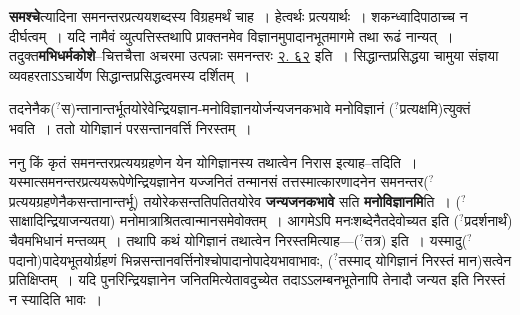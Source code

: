 \documentclass[article,12pt,a4paper]{memoir}
\newcommand{\unclear}[1]{($^{?}$#1)}
\begin{document}
	  \pstart \textbf{समश्चे}त्यादिना समनन्तरप्रत्ययशब्दस्य विग्रहमर्थं चाह । हेत्वर्थः प्रत्ययार्थः । शकन्ध्वादिपाठाच्च न दीर्घत्वम् । यदि नामैवं व्युत्पत्तिस्तथापि प्राक्तनमेव विज्ञानमुपादानभूतमागमे तथा रूढं नान्यत् । तदुक्त\textbf{मभिधर्मकोशे}--चित्तचैत्ता अचरमा उत्पन्नाः समनन्तरः \href{http://sarit.indology.info/?cref=ak.2.62}{२. ६२} इति । सिद्धान्तप्रसिद्धया चामुया संज्ञया व्यवहरताऽऽचार्येण सिद्धान्तप्रसिद्धत्वमस्य दर्शितम् ।
	\pend
	  \bigskip
	  \begingroup
	

	  \pstart तदनेनैक\unclear{स}न्तानान्तर्भूतयोरेवेन्द्रियज्ञान-मनोविज्ञानयोर्जन्यजनकभावे मनोविज्ञानं \unclear{प्रत्यक्षमि}त्युक्तं भवति । ततो योगिज्ञानं परसन्तानवर्त्ति निरस्तम् ।
	\pend
      
	  \endgroup
	

	  \pstart ननु किं कृतं समनन्तरप्रत्ययग्रहणेन येन योगिज्ञानस्य तथात्वेन निरास इत्याह--तदिति । यस्मात्समनन्तरप्रत्ययरूपेणेन्द्रियज्ञानेन यज्जनितं तन्मानसं तत्तस्मात्कारणादनेन समनन्तर\unclear{प्रत्ययग्रहणेनैकसन्तानान्तर्भू} तयोरेकसन्ततिपतितयोरेव \textbf{जन्यजनकभावे} सति \textbf{मनोविज्ञानमि}ति । \unclear{साक्षादिन्द्रियाजन्यतया} मनोमात्राश्रितत्वान्मानसमेवोक्तम् । आगमेऽपि मनःशब्देनैतदेवोच्यत इति \unclear{प्रदर्शनार्थं} चैवमभिधानं मन्तव्यम् । तथापि कथं योगिज्ञानं तथात्वेन निरस्तमित्याह—\unclear{तत्र} इति । यस्मादु\unclear{पदानो}पादेयभूतयोर्ग्रहणं भिन्नसन्तानवर्त्तिनोश्चोपादानोपादेयभावाभावः, \unclear{तस्माद् योगिज्ञानं निरस्तं मान}सत्वेन प्रतिक्षिप्तम् । यदि पुनरिन्द्रियज्ञानेन जनितमित्येतावदुच्येत तदाऽऽलम्बनभूतेनापि तेनादौ जन्यत इति निरस्तं न स्यादिति भावः ।
	\pend
      
\end{document}
